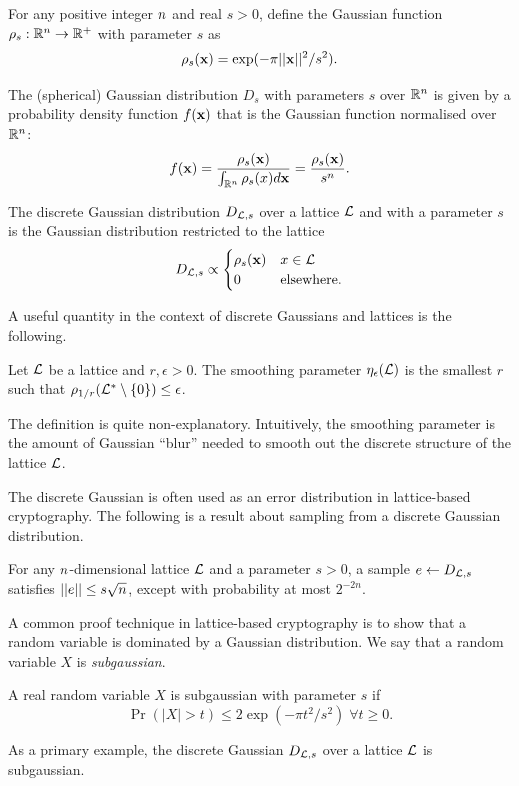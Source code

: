 \begin{definition}
    For any positive integer $n$ and real $s > 0$, define the Gaussian function $\rho_s : \mathbb{R}^{n} \to \mathbb{R}^+$ with parameter $s$ as \[ \rho_s(\mathbf{x}) = \exp(-\pi || \mathbf{x} ||^2 / s^2). \]
\end{definition}

\begin{definition}
    The (spherical) Gaussian distribution $D_s$ with parameters $s$ over $\mathbb{R}^{n}$ is given by a probability density function $f(\mathbf{x})$ that is the Gaussian function normalised over $\mathbb{R}^{n}$:
    \[ f(\mathbf{x}) = \frac{\rho_s(\mathbf{x})}{\int_{\mathbb{R}^{n}} \rho_s(x) d \mathbf{x}} = \frac{\rho_s(\mathbf{x})}{s^{n}}. \]
\end{definition}

\begin{definition}
    The discrete Gaussian distribution $D_{\mathcal{L}, s}$ over a lattice $\mathcal{L}$ and with a parameter $s$ is the Gaussian distribution restricted to the lattice
    \[ D_{\mathcal{L}, s} \propto \begin{cases}
        \rho_s(\mathbf{x}) & x \in \mathcal{L} \\
        0 & \mathrm{elsewhere}.
    \end{cases} \]
\end{definition}

A useful quantity in the context of discrete Gaussians and lattices is the following.
\begin{definition}
    Let $\mathcal{L}$ be a lattice and $r, \epsilon > 0$. The smoothing parameter $\eta_\epsilon(\mathcal{L})$ is the smallest $r$ such that $\rho_{1/r}(\mathcal{L}^* \setminus \{ 0 \}) \leq \epsilon$.
\end{definition}
The definition is quite non-explanatory. Intuitively, the smoothing parameter is the amount of Gaussian ``blur'' needed to smooth out the discrete structure of the lattice $\mathcal{L}$.

The discrete Gaussian is often used as an error distribution in lattice-based cryptography. The following is a result about sampling from a discrete Gaussian distribution.

\begin{lemma}
    For any $n$-dimensional lattice $\mathcal{L}$ and a parameter $s > 0$, a sample $e \leftarrow D_{\mathcal{L}, s}$ satisfies $|| e || \leq s \sqrt{n}$, except with probability at most $2^{-2n}$.
\end{lemma}

A common proof technique in lattice-based cryptography is to show that a random variable is dominated by a Gaussian distribution. We say that a random variable $X$ is \textit{subgaussian}.

\begin{definition}
    A real random variable $X$ is subgaussian with parameter $s$ if \[ \Pr(|X| > t) \leq 2 \exp ( -\pi t^2 / s^2) \; \forall t \geq 0. \]
\end{definition}
As a primary example, the discrete Gaussian $D_{\mathcal{L}, s}$ over a lattice $\mathcal{L}$ is subgaussian.